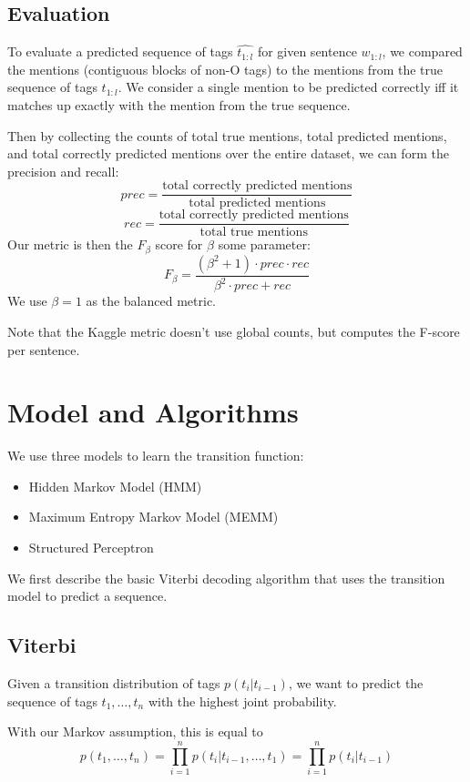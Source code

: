 \documentclass[11pt]{article}
\begin{document}
\subsection{Evaluation}

To evaluate a predicted sequence of tags $\widehat{t_{1:l}}$ for given sentence $w_{1:l}$, we compared the mentions (contiguous blocks of non-O tags) to the mentions from the true sequence of tags $t_{1:l}$. We consider a single mention to be predicted correctly iff it matches up exactly with the mention from the true sequence.

Then by collecting the counts of total true mentions, total predicted mentions, and total correctly predicted mentions over the entire dataset, we can form the precision and recall:
$$prec = \frac{\text{total correctly predicted mentions}}{\text{total predicted mentions}}$$
$$rec = \frac{\text{total correctly predicted mentions}}{\text{total true mentions}}$$
Our metric is then the $F_\beta$ score for $\beta$ some parameter:
$$F_\beta = \frac{(\beta^2 + 1) \cdot prec \cdot rec}{\beta^2 \cdot prec + rec}$$
We use $\beta = 1$ as the balanced metric. 

Note that the Kaggle metric doesn't use global counts, but computes the F-score per sentence.

\section{Model and Algorithms}

We use three models to learn the transition function:
\begin{itemize}
  \item Hidden Markov Model (HMM)
  \item Maximum Entropy Markov Model (MEMM)
  \item Structured Perceptron
\end{itemize}

We first describe the basic Viterbi decoding algorithm that uses the transition model to predict a sequence.

\subsection{Viterbi}

Given a transition distribution of tags $p(t_i | t_{i-1})$, we want to predict the sequence of tags $t_1, \dots, t_n$ with the highest joint probability. 

With our Markov assumption, this is equal to 
$$p(t_1, \dots, t_n) = \prod_{i=1}^n p(t_i | t_{i-1}, \dots, t_1) = \prod_{i=1}^n p(t_i | t_{i-1})$$
\end{document}
